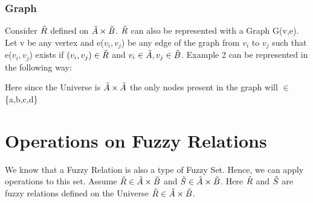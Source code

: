 \documentclass{article}
\begin{document}
\subsubsection{Graph}
Consider $\Tilde{R}$ defined on $\Tilde{A}\times\Tilde{B}$. $\Tilde{R}$ can also be represented with a Graph G(v,e).\newline
Let v be any vertex and e($v_i,v_j$) be any edge of the graph from $v_i$ to $v_j$ such that e($v_i,v_j$) exists if $(v_i,v_j)\in \Tilde{R}$ and $v_i\in {\Tilde{A}}, v_j \in {\Tilde{B}}$. Example 2 can be represented in the following way:\newline\newline
\begin{center}
\end{center}
Here since the Universe is $\Tilde{A}\times\Tilde{A}$ the only nodes present in the graph will $\in$ \{a,b,c,d\}

\section{Operations on Fuzzy Relations}
We know that a Fuzzy Relation is also a type of Fuzzy Set. Hence, we can apply operations to this set. Assume $\Tilde{R}\in\Tilde{A}\times\Tilde{B}$ and $\Tilde{S}\in\Tilde{A}\times\Tilde{B}$. Here $\Tilde{R}$ and $\Tilde{S}$ are fuzzy relations defined on the Universe $\Tilde{R}\in\Tilde{A}\times\Tilde{B}$.
\end{document}
